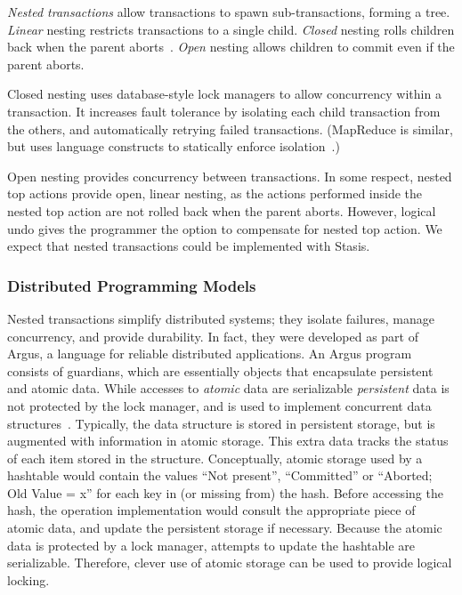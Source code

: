 \documentclass[letterpaper,twocolumn,10pt]{article}
\newcommand{\yad}{Stasis\xspace}
\begin{document}
{\em Nested transactions} allow transactions to spawn sub-transactions,
forming a tree.  {\em Linear} nesting
restricts transactions to a single child.  {\em Closed} nesting rolls
children back when the parent aborts~\cite{nestedTransactionBook}.
{\em Open} nesting allows children to commit even if the parent
aborts.

Closed nesting uses database-style lock managers to allow concurrency
within a transaction.  It increases fault tolerance by isolating each
child transaction from the others, and automatically retrying failed
transactions.  (MapReduce is similar, but uses language constructs to
statically enforce isolation~\cite{mapReduce}.)

Open nesting provides concurrency between transactions.  In
some respect, nested top actions provide open, linear nesting, as the
actions performed inside the nested top action are not rolled back
when the parent aborts.  However, logical undo gives the programmer
the option to compensate for nested top action. We expect that nested
transactions could be implemented with \yad.

\subsubsection{Distributed Programming Models}


Nested transactions simplify distributed systems; they isolate
failures, manage concurrency, and provide durability.  In fact, they
were developed as part of Argus, a language for reliable distributed applications.  An Argus
program consists of guardians, which are essentially objects that
encapsulate persistent and atomic data.  While accesses to {\em atomic} data are 
serializable {\em persistent} data is not protected by the lock manager, 
and is used to implement concurrent data structures~\cite{argus}.  
Typically, the data structure is stored in persistent storage, but is augmented with
information in atomic storage.  This extra data tracks the
status of each item stored in the structure.  Conceptually, atomic 
storage used by a hashtable would contain the values ``Not present'',
``Committed'' or ``Aborted; Old Value = x'' for each key in (or
missing from) the hash.  Before accessing the hash, the operation
implementation would consult the appropriate piece of atomic data, and
update the persistent storage if necessary.  Because the atomic data is
protected by a lock manager, attempts to update the hashtable are serializable.
Therefore, clever use of atomic storage can be used to provide logical locking.
\end{document}
